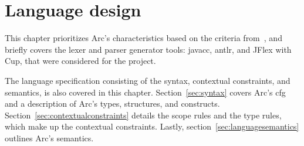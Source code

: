 \chapter{Language design}\label{cha:languagedesign}
This chapter prioritizes Arc's characteristics based on the criteria from~\cite{Sebesta2016}, and briefly covers the lexer and parser generator tools: \gls{javacc}, \gls{antlr}, and JFlex with Cup, that were considered for the project.

The language specification consisting of the syntax, contextual constraints, and semantics, is also covered in this chapter. Section~\ref{sec:syntax} covers Arc's \gls{cfg} and a description of Arc's types, structures, and constructs. Section~\ref{sec:contextualconstraints} details the scope rules and the type rules, which make up the contextual constraints. Lastly, section~\ref{sec:languagesemantics} outlines Arc's semantics.






